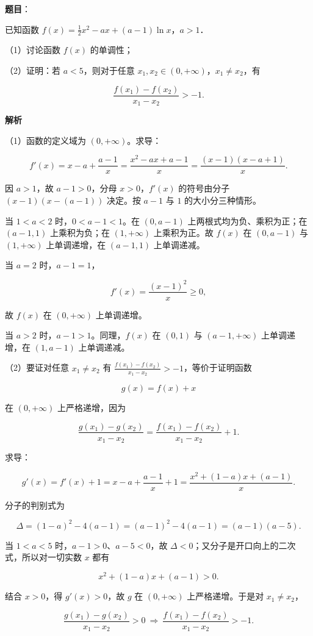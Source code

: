 \begin{answer}

\textbf{题目}：

已知函数 $f(x)=\frac12x^2-ax+(a-1)\ln x$，$a>1$．

（1）讨论函数 $f(x)$ 的单调性；

（2）证明：若 $a<5$，则对于任意 $x_1,x_2\in(0,+\infty)$，$x_1\neq x_2$，有

\nopagebreak[4]
\[\frac{f(x_1)-f(x_2)}{x_1-x_2}>-1 .\]

\textbf{解析}

（1）函数的定义域为 $(0,+\infty)$。求导：

\nopagebreak[4]
\[f'(x)=x-a+\frac{a-1}{x}
=\frac{x^2-ax+a-1}{x}
=\frac{(x-1)(x-a+1)}{x}.\]

因 $a>1$，故 $a-1>0$，分母 $x>0$，$f'(x)$ 的符号由分子 $(x-1)(x-(a-1))$ 决定。按 $a-1$ 与 $1$ 的大小分三种情形。

当 $1<a<2$ 时，$0<a-1<1$。在 $(0,a-1)$ 上两根式均为负、乘积为正；在 $(a-1,1)$ 上乘积为负；在 $(1,+\infty)$ 上乘积为正。故 $f(x)$ 在 $(0,a-1)$ 与 $(1,+\infty)$ 上单调递增，在 $(a-1,1)$ 上单调递减。

当 $a=2$ 时，$a-1=1$，

\nopagebreak[4]
\[f'(x)=\frac{(x-1)^2}{x}\geqslant0,\]

故 $f(x)$ 在 $(0,+\infty)$ 上单调递增。

当 $a>2$ 时，$a-1>1$。同理，$f(x)$ 在 $(0,1)$ 与 $(a-1,+\infty)$ 上单调递增，在 $(1,a-1)$ 上单调递减。

（2）要证对任意 $x_1\neq x_2$ 有 $\frac{f(x_1)-f(x_2)}{x_1-x_2}>-1$，等价于证明函数

\nopagebreak[4]
\[g(x)=f(x)+x\]

在 $(0,+\infty)$ 上严格递增，因为

\nopagebreak[4]
\[\frac{g(x_1)-g(x_2)}{x_1-x_2}
=\frac{f(x_1)-f(x_2)}{x_1-x_2}+1 .\]

求导：

\nopagebreak[4]
\[g'(x)=f'(x)+1
=x-a+\frac{a-1}{x}+1
=\frac{x^2+(1-a)x+(a-1)}{x}.\]

分子的判别式为

\nopagebreak[4]
\[\Delta=(1-a)^2-4(a-1)
=(a-1)^2-4(a-1)
=(a-1)(a-5).\]

当 $1<a<5$ 时，$a-1>0$、$a-5<0$，故 $\Delta<0$；又分子是开口向上的二次式，所以对一切实数 $x$ 都有

\nopagebreak[4]
\[x^2+(1-a)x+(a-1)>0 .\]

结合 $x>0$，得 $g'(x)>0$，故 $g$ 在 $(0,+\infty)$ 上严格递增。于是对 $x_1\neq x_2$，

\nopagebreak[4]
\[\frac{g(x_1)-g(x_2)}{x_1-x_2}>0
\ \Longrightarrow\ \frac{f(x_1)-f(x_2)}{x_1-x_2}>-1 .\]


\end{answer}

